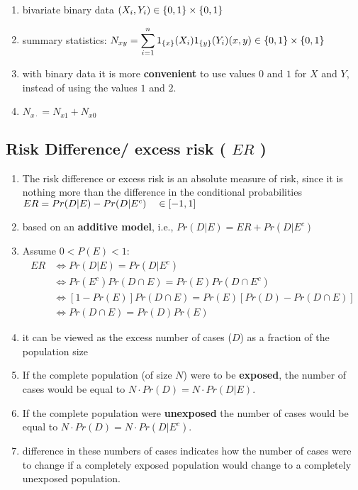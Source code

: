\begin{enumerate}[itemsep=0.2cm]
    \item bivariate binary data $(X_i, Y_i) \in \left\{0, 1\right\} \times \left\{0, 1\right\}$

    \item summary statistics:
    $
        N_{xy}
        = \dsum_{i=1}^n 1_{\dCurlyBrac{x}}(X_i)1_{\dCurlyBrac{y}}(Y_i)
        \hfill
        (x, y) \in \dCurlyBrac{0, 1}\times\dCurlyBrac{0, 1}
    $

    \item with binary data it is more \textbf{convenient} to use values $0$ and $1$ for $X$ and $Y$, instead of using the values $1$ and $2$.

    \item $N_{x\cdot} = N_{x1} + N_{x0}$ 
\end{enumerate}


\subsection{Risk Difference/ excess risk ( $ER$ ) \cite{ism-1}} \label{Risk Difference/ excess risk}

\begin{enumerate}[itemsep=0.2cm]
    \item The risk difference or excess risk is an absolute measure of risk, since it is nothing more than the difference in the conditional probabilities
    $
        \hfill
        ER = Pr(D|E) - Pr(D|E^c)
        \quad \in [-1, 1]
        \hfill
    $

    \item based on an \textbf{additive model}, i.e., $Pr (D|E) = ER + Pr (D|E^c)$

    \item Assume $0 < P(E) < 1$:
    \begin{align*}
        ER  
        &\Leftrightarrow Pr (D|E) = Pr (D|E^c) \\
        &\Leftrightarrow Pr (E^c) Pr (D \cap E) = Pr (E) Pr (D \cap E^c) \\
        &\Leftrightarrow [1 - Pr (E)] Pr (D \cap E) = Pr (E)[Pr(D) - Pr (D \cap E)] \\
        &\Leftrightarrow Pr (D \cap E) = Pr (D) Pr (E)
    \end{align*}

    \item it can be viewed as the excess number of cases ($D$) as a fraction of the population size

    \item If the complete population (of size $N$) were to be \textbf{exposed}, the number of cases would be equal to $N \cdot Pr (D) = N \cdot Pr (D|E)$.

    \item If the complete population were \textbf{unexposed} the number of cases would be equal to $N \cdot Pr (D) = N \cdot Pr (D|E^c)$.

    \item difference in these numbers of cases indicates how the number of cases were to change if a completely exposed population would change to a completely unexposed population.
\end{enumerate}

